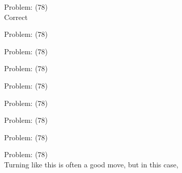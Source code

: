 \documentclass[11pt]{article}
\begin{document}
\begin{minipage}[t]{0.5\textwidth}
  {\centering
  
Problem: (78)\\
Correct\\
  }
\end{minipage}
\begin{minipage}[t]{0.5\textwidth}
  {\centering
  
Problem: (78)\\
  }
\end{minipage}
\begin{minipage}[t]{0.5\textwidth}
  {\centering
  
Problem: (78)\\
  }
\end{minipage}
\begin{minipage}[t]{0.5\textwidth}
  {\centering
  
Problem: (78)\\
  }
\end{minipage}
\begin{minipage}[t]{0.5\textwidth}
  {\centering
  
Problem: (78)\\
  }
\end{minipage}
\begin{minipage}[t]{0.5\textwidth}
  {\centering
  
Problem: (78)\\
  }
\end{minipage}
\begin{minipage}[t]{0.5\textwidth}
  {\centering
  
Problem: (78)\\
  }
\end{minipage}
\begin{minipage}[t]{0.5\textwidth}
  {\centering
  
Problem: (78)\\
  }
\end{minipage}
\begin{minipage}[t]{0.5\textwidth}
  {\centering
  
Problem: (78)\\
Turning like this is often a good move, but in this case,\\
  }
\end{minipage}
\end{document}

